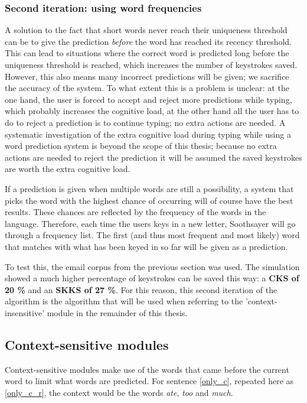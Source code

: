 \documentclass[12pt]{article}
\begin{document}
\subsubsection{Second iteration: using word frequencies}
A solution to the fact that short words never reach their uniqueness threshold can be to give the prediction \emph{before} the word has reached its recency threshold. This can lead to situations where the correct word is predicted long before the uniqueness threshold is reached, which increases the number of keystrokes saved. However, this also means many incorrect predictions will be given; we sacrifice the accuracy of the system. To what extent this is a problem is unclear: at the one hand, the user is forced to accept and reject more predictions while typing, which probably increases the cognitive load, at the other hand all the user has to do to reject a prediction is to continue typing; no extra actions are needed. A systematic investigation of the extra cognitive load during typing while using a word prediction system is beyond the scope of this thesis; because no extra actions are needed to reject the prediction it will be assumed the saved keystrokes are worth the extra cognitive load.

If a prediction is given when multiple words are still a possibility, a system that picks the word with the highest chance of occurring will of course have the best results. These chances are reflected by the frequency of the words in the language. Therefore, each time the users keys in a new letter, Soothsayer will go through a frequency list. The first (and thus most frequent and most likely) word that matches with what has been keyed in so far will be given as a prediction.

To test this, the email corpus from the previous section was used. The simulation showed a much higher percentage of keystrokes can be saved this way: a \textbf{CKS of 20 \%} and an \textbf{SKKS of 27 \%}. For this reason, this second iteration of the algorithm is the algorithm that will be used when referring to the 'context-insensitive' module in the remainder of this thesis.

\subsection{Context-sensitive modules} \label{cs}

Context-sensitive modules make use of the words that came before the current word to limit what words are predicted. For sentence \ref{only_c}, repeated here as \ref{only_c_r}, the context would be the words \emph{ate}, \emph{too} and \emph{much}.
\end{document}
